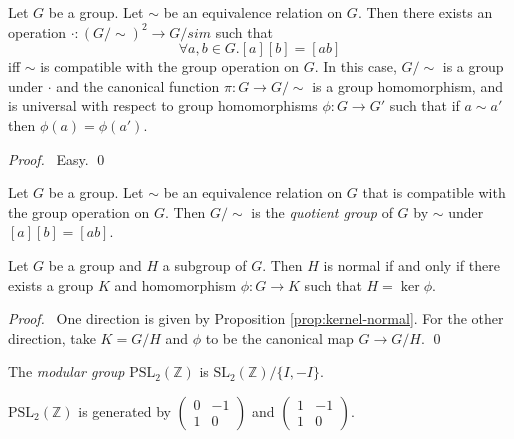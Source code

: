 \begin{prop}
Let $G$ be a group. Let $\sim$ be an equivalence relation on $G$. Then there exists an operation $\cdot : (G/\sim)^2 \rightarrow G/sim$ such that
\[ \forall a,b \in G. [a][b] = [ab] \]
iff $\sim$ is compatible with the group operation on $G$. In this case, $G/\sim$ is a group under $\cdot$ and the canonical function $\pi : G \rightarrow G / \sim$ is a group homomorphism, and is universal with respect to group homomorphisms $\phi : G \rightarrow G'$ such that if $a \sim a'$ then $\phi(a) = \phi(a')$.
\end{prop}

\begin{proof}
\pf\ Easy. \qed
\end{proof}

\begin{df}
Let $G$ be a group. Let $\sim$ be an equivalence relation on $G$ that is compatible with the group operation on $G$. Then $G/\sim$ is the \emph{quotient group} of $G$ by $\sim$ under $[a][b] = [ab]$.
\end{df}

\begin{prop}
Let $G$ be a group and $H$ a subgroup of $G$. Then $H$ is normal if and only if there exists a group $K$ and homomorphism $\phi : G \rightarrow K$ such that $H = \ker \phi$.
\end{prop}

\begin{proof}
\pf\ One direction is given by Proposition \ref{prop:kernel-normal}. For the other direction, take $K = G / H$ and $\phi$ to be the canonical map $G \rightarrow G / H$. \qed
\end{proof}

\begin{df}
The \emph{modular group} $\mathrm{PSL}_2(\mathbb{Z})$ is $\mathrm{SL}_2(\mathbb{Z}) / \{ I, -I \}$.
\end{df}

\begin{prop}
$\mathrm{PSL}_2(\mathbb{Z})$ is generated by $\left( \begin{array}{cc} 0 & -1 \\ 1 & 0 \end{array} \right)$ and $\left( \begin{array}{cc} 1 & -1 \\ 1 & 0 \end{array} \right)$.
\end{prop}

